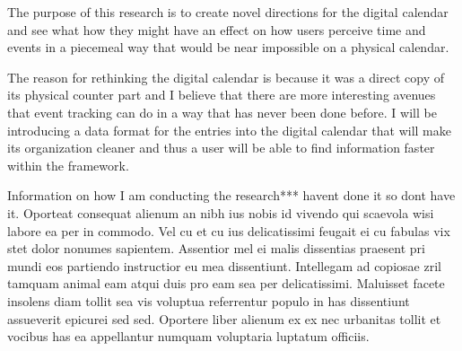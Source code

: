 The purpose of this research is to create novel directions for the digital calendar and see what how they might have an effect on how users perceive time and events in a piecemeal way that would be near impossible on a physical calendar.

The reason for rethinking the digital calendar is because it was a direct copy of its physical counter part and I believe that there are more interesting avenues that event tracking can do in a way that has never been done before. I will be introducing a data format for the entries into the digital calendar that will make its organization cleaner and thus a user will be able to find information faster within the framework.

Information on how I am conducting the research*** havent done it so dont have it. Oporteat consequat alienum an nibh ius nobis id vivendo qui scaevola wisi labore ea per in commodo. Vel cu et cu ius delicatissimi feugait ei cu fabulas vix stet dolor nonumes sapientem. Assentior mel ei malis dissentias praesent pri mundi eos partiendo instructior eu mea dissentiunt. Intellegam ad copiosae zril tamquam animal eam atqui duis pro eam sea per delicatissimi. Maluisset facete insolens diam tollit sea vis voluptua referrentur populo in has dissentiunt assueverit epicurei sed sed. Oportere liber alienum ex ex nec urbanitas tollit et vocibus has ea appellantur numquam voluptaria luptatum officiis.